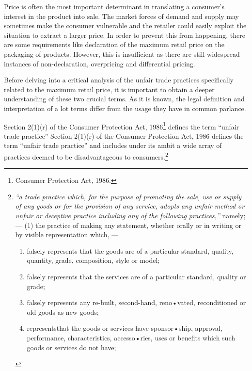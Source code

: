 \begin{multicols}{2}
\noi
Price is often the most important determinant in translating a consumer’s interest in the product
into sale. The market forces of demand and supply may sometimes make the consumer
vulnerable and the retailer could easily exploit the situation to extract a larger price. In order to
prevent this from happening, there are some requirements like declaration of the maximum
retail price on the packaging of products. However, this is insufficient as there are still
widespread instances of non-declaration, overpricing and differential pricing.


\noi
Before delving into a critical analysis of the unfair trade practices specifically related to the
maximum retail price, it is important to obtain a deeper understanding of these two crucial
terms. As it is known, the legal definition and interpretation of a lot terms differ from the usage
they have in common parlance.

\noi
Section 2(1)(r) of the Consumer Protection Act, 1986\footnote{Consumer Protection Act, 1986.} defines the term “unfair trade practice” Section 2(1)(r) of the Consumer Protection Act, 1986 defines the term “unfair trade practice” and includes under its ambit a wide array of practices deemed to be disadvantageous to consumers.\footnote{\textit{“a trade practice which, for the purpose of promoting the sale, use or supply of any goods or for the provision of any service, adopts any unfair method or unfair or deceptive practice including any of the following practices,”} namely; —
(1) the practice of making any statement, whether orally or in writing or by visible representation which, —
\begin{enumerate}[label=(\roman*)]
\item falsely represents that the goods are of a particular standard, quality, quantity, grade, composition, style or
model;

\item falsely represents that the services are of a particular standard, quality or grade;

\item falsely represents any re-built, second-hand, reno•vated, reconditioned or old goods as new goods;

\item representsthat the goods or services have sponsor•ship, approval, performance, characteristics,
accesso•ries, uses or benefits which such goods or services do not have;


\end{enumerate}}
\end{multicols}
